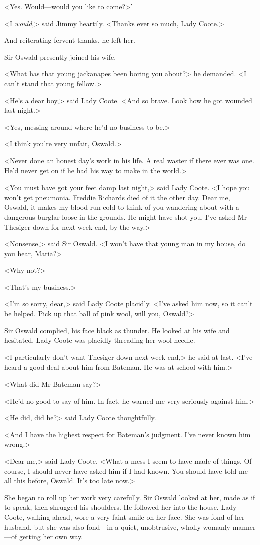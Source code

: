 <Yes. Would—would you like to come?>'

<I \emph{would},> said Jimmy heartily. <Thanks ever so much, Lady Coote.>

And reiterating fervent thanks, he left her.

Sir Oswald presently joined his wife.

<What has that young jackanapes been boring you about?> he demanded. <I can't stand that young fellow.>

<He's a dear boy,> said Lady Coote. <And so brave. Look how he got wounded last night.>

<Yes, messing around where he'd no business to be.>

<I think you're very unfair, Oswald.>

<Never done an honest day's work in his life. A real waster if there ever was one. He'd never get on if he had his way to make in the world.>

<You must have got your feet damp last night,> said Lady Coote. <I hope you won't get pneumonia. Freddie Richards died of it the other day. Dear me, Oswald, it makes my blood run cold to think of you wandering about with a dangerous burglar loose in the grounds. He might have shot you. I've asked Mr Thesiger down for next week-end, by the way.>

<Nonsense,> said Sir Oswald. <I won't have that young man in my house, do you hear, Maria?>

<Why not?>

<That's my business.>

<I'm so sorry, dear,> said Lady Coote placidly. <I've asked him now, so it can't be helped. Pick up that ball of pink wool, will you, Oswald?>

Sir Oswald complied, his face black as thunder. He looked at his wife and hesitated. Lady Coote was placidly threading her wool needle.

<I particularly don't want Thesiger down next week-end,> he said at last. <I've heard a good deal about him from Bateman. He was at school with him.>

<What did Mr Bateman say?>

<He'd no good to say of him. In fact, he warned me very seriously against him.>

<He did, did he?> said Lady Coote thoughtfully.

<And I have the highest respect for Bateman's judgment. I've never known him wrong.>

<Dear me,> said Lady Coote. <What a mess I seem to have made of things. Of course, I should never have asked him if I had known. You should have told me all this before, Oswald. It's too late now.>

She began to roll up her work very carefully. Sir Oswald looked at her, made as if to speak, then shrugged his shoulders. He followed her into the house. Lady Coote, walking ahead, wore a very faint smile on her face. She was fond of her husband, but she was also fond—in a quiet, unobtrusive, wholly womanly manner—of getting her own way.